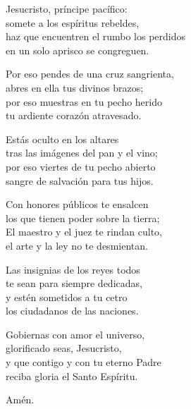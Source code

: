 \documentclass[12pt, letterpaper]{report}
\begin{document}
    \noindent
    Jesucristo, pr\'incipe pac\'ifico:\\
    somete a los esp\'iritus rebeldes,\\
    haz que encuentren el rumbo los perdidos\\
    en un solo aprisco se congreguen.

    \noindent
    Por eso pendes de una cruz sangrienta,\\
    abres en ella tus divinos brazos;\\
    por eso muestras en tu pecho herido\\
    tu ardiente coraz\'on atravesado.

    \noindent
    Est\'as oculto en los altares\\
    tras las im\'agenes del pan y el vino;\\
    por eso viertes de tu pecho abierto\\
    sangre de salvaci\'on para tus hijos.

    \noindent
    Con honores p\'ublicos te ensalcen\\
    los que tienen poder sobre la tierra;\\
    El maestro y el juez te rindan  culto,\\
    el arte y la ley no te desmientan.

    \noindent
    Las insignias de los reyes todos\\
    te sean para siempre dedicadas,\\
    y est\'en sometidos a tu cetro\\
    los ciudadanos de las naciones.

    \noindent
    Gobiernas con amor el universo,\\
    glorificado seas, Jesucristo,\\
    y que contigo y con tu eterno Padre\\
    reciba gloria el Santo Esp\'iritu.

    \noindent
    Am\'en.
    \clearpage

    {%
\parindent 0pt
\noindent
\ifx\preLilyPondExample \undefined
\else
  \expandafter\preLilyPondExample
\fi
\def\lilypondbook{}%
%
\ifx\postLilyPondExample \undefined
\else
  \expandafter\postLilyPondExample
\fi
}
    \clearpage

    {%
\parindent 0pt
\noindent
\ifx\preLilyPondExample \undefined
\else
  \expandafter\preLilyPondExample
\fi
\def\lilypondbook{}%
%
\ifx\postLilyPondExample \undefined
\else
  \expandafter\postLilyPondExample
\fi
}
    \clearpage
\end{document}

